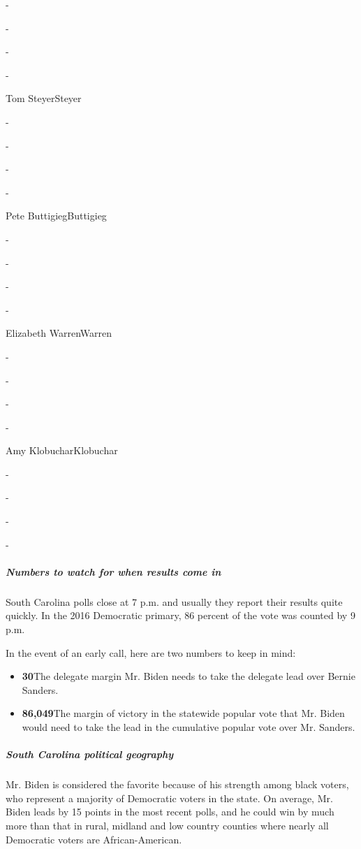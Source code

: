 -

-

-

-

Tom SteyerSteyer

-

-

-

-

Pete ButtigiegButtigieg

-

-

-

-

Elizabeth WarrenWarren

-

-

-

-

Amy KlobucharKlobuchar

-

-

-

-

\hypertarget{numbers-to-watch-for-when-results-come-in}{%
\subparagraph{Numbers to watch for when results come
in}\label{numbers-to-watch-for-when-results-come-in}}

South Carolina polls close at 7 p.m. and usually they report their
results quite quickly. In the 2016 Democratic primary, 86 percent of the
vote was counted by 9 p.m.

In the event of an early call, here are two numbers to keep in mind:

\begin{itemize}
\tightlist
\item
  \textbf{30}The delegate margin Mr. Biden needs to take the delegate
  lead over Bernie Sanders.
\item
  \textbf{86,049}The margin of victory in the statewide popular vote
  that Mr. Biden would need to take the lead in the cumulative popular
  vote over Mr. Sanders.
\end{itemize}

\hypertarget{south-carolina-political-geography}{%
\subparagraph{South Carolina political
geography}\label{south-carolina-political-geography}}

Mr. Biden is considered the favorite because of his strength among black
voters, who represent a majority of Democratic voters in the state. On
average, Mr. Biden leads by 15 points in the most recent polls, and he
could win by much more than that in rural, midland and low country
counties where nearly all Democratic voters are African-American.


